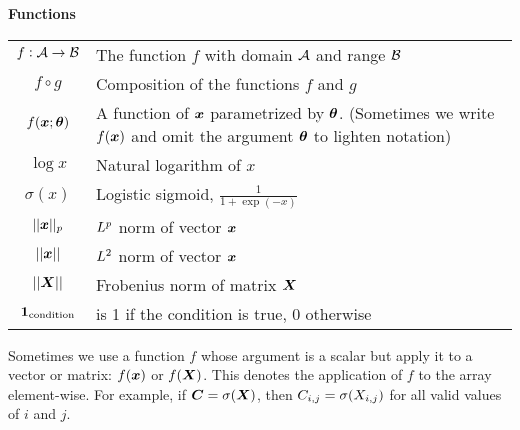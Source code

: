 \vspace{\notationgap}
\begin{minipage}{\textwidth}
	\centerline{\bf Functions}
	\bgroup
	\def\arraystretch{1.5}
	\begin{tabular}{cp{3.25in}}
		$\displaystyle f: {\mathcal{A}} \rightarrow {\mathcal{B}}$ & The function $f$ with domain ${\mathcal{A}}$ and range ${\mathcal{B}}$\\
		$\displaystyle f \circ g $ & Composition of the functions $f$ and $g$ \\
		$\displaystyle f({\bm{x}} ; {\bm{\theta}}) $ & A function of ${\bm{x}}$ parametrized by ${\bm{\theta}}$.
		(Sometimes we write $f({\bm{x}})$ and omit the argument ${\bm{\theta}}$ to lighten notation) \\
		$\displaystyle \log x$ & Natural logarithm of $x$ \\
		$\displaystyle \sigma(x)$ & Logistic sigmoid, $\displaystyle \frac{1} {1 + \exp(-x)}$ \\
		$\displaystyle || {\bm{x}} ||_p $ & $L^p$ norm of vector ${\bm{x}}$ \\
		$\displaystyle || {\bm{x}} || $ & $L^2$ norm of vector ${\bm{x}}$ \\
        $\displaystyle || {\bm{X}} || $ & Frobenius norm of matrix ${\bm{X}}$ \\
		$\displaystyle \bm{1}_\mathrm{condition}$ & is 1 if the condition is true, 0 otherwise\\
	\end{tabular}
	\egroup
\end{minipage}

Sometimes we use a function $f$ whose argument is a scalar but apply
it to a vector or matrix: $f({\bm{x}})$ or $f({\bm{X}})$.
This denotes the application of $f$ to the
array element-wise. For example, if ${\bm{C}} = \sigma({\bm{X}})$, then ${C}_{i,j} = \sigma({X}_{i,j})$
for all valid values of $i$ and $j$.

